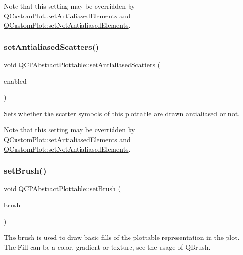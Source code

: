 Note that this setting may be overridden by \mbox{\hyperlink{class_q_custom_plot_af6f91e5eab1be85f67c556e98c3745e8}{Q\+Custom\+Plot\+::set\+Antialiased\+Elements}} and \mbox{\hyperlink{class_q_custom_plot_ae10d685b5eabea2999fb8775ca173c24}{Q\+Custom\+Plot\+::set\+Not\+Antialiased\+Elements}}. \mbox{\label{class_q_c_p_abstract_plottable_a2f03f067ede2ed4da6f7d0e4777a3f02}} 
\subsubsection{\texorpdfstring{set\+Antialiased\+Scatters()}{setAntialiasedScatters()}}
{\footnotesize\ttfamily void Q\+C\+P\+Abstract\+Plottable\+::set\+Antialiased\+Scatters (\begin{DoxyParamCaption}\item[{bool}]{enabled }\end{DoxyParamCaption})}

Sets whether the scatter symbols of this plottable are drawn antialiased or not.

Note that this setting may be overridden by \mbox{\hyperlink{class_q_custom_plot_af6f91e5eab1be85f67c556e98c3745e8}{Q\+Custom\+Plot\+::set\+Antialiased\+Elements}} and \mbox{\hyperlink{class_q_custom_plot_ae10d685b5eabea2999fb8775ca173c24}{Q\+Custom\+Plot\+::set\+Not\+Antialiased\+Elements}}. \mbox{\label{class_q_c_p_abstract_plottable_a7a4b92144dca6453a1f0f210e27edc74}} 
\subsubsection{\texorpdfstring{set\+Brush()}{setBrush()}}
{\footnotesize\ttfamily void Q\+C\+P\+Abstract\+Plottable\+::set\+Brush (\begin{DoxyParamCaption}\item[{const Q\+Brush \&}]{brush }\end{DoxyParamCaption})}

The brush is used to draw basic fills of the plottable representation in the plot. The Fill can be a color, gradient or texture, see the usage of Q\+Brush.

